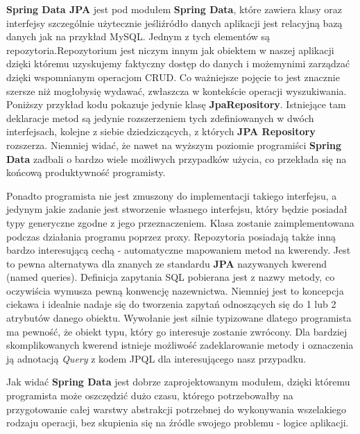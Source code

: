 	\label{tech:spring_data_jpa}
	\textbf{Spring Data JPA} jest pod modułem \textbf{Spring Data}, które zawiera klasy oraz interfejsy szczególnie użytecznie jeśliźródło danych aplikacji jest relacyjną bazą danych jak na przykład MySQL. Jednym z tych elementów są repozytoria.Repozytorium jest niczym innym jak obiektem w naszej aplikacji dzięki któremu uzyskujemy faktyczny dostęp do danych i możemynimi zarządzać dzięki wspomnianym operacjom CRUD. Co ważniejsze pojęcie to jest znacznie szersze niż mogłobysię wydawać, zwłaszcza w kontekście operacji wyszukiwania. Poniższy przykład kodu pokazuje jedynie klasę \textbf{JpaRepository}. Istniejące tam deklaracje metod są jedynie rozszerzeniem tych zdefiniowanych w dwóch interfejsach, kolejne z siebie dziedziczących, z których \textbf{JPA Repository} rozszerza. Niemniej widać, że nawet na wyższym poziomie programiści \textbf{Spring Data} zadbali o bardzo wiele możliwych przypadków użycia, co przekłada się na końcową produktywność programisty. 
	Ponadto programista nie jest zmuszony do implementacji takiego interfejsu, a jedynym jakie zadanie jest stworzenie własnego interfejsu, który będzie posiadał typy generyczne zgodne z jego przeznaczeniem. Klasa zostanie zaimplementowana podczas działania programu poprzez proxy. Repozytoria posiadają także inną bardzo interesującą cechą - automatyczne mapowaniem metod na kwerendy. Jest to pewna alternatywa dla znanych ze standardu \textbf{JPA} nazywanych kwerend (named queries). Definicja zapytania SQL pobierana jest z nazwy metody, co oczywiścia wymusza pewną konwencję nazewnictwa. Niemniej jest to koncepcja ciekawa i idealnie nadaje się do tworzenia zapytań odnoszących się do 1 lub 2 atrybutów danego obiektu. Wywołanie jest silnie typizowane dlatego programista ma pewność, że obiekt typu, który go interesuje zostanie zwrócony. Dla bardziej skomplikowanych kwerend istnieje możliwość zadeklarowanie metody i oznaczenia ją adnotacją \textit{\@{}Query} z kodem JPQL\cite{jpql} dla interesującego nasz przypadku\cite{spring_data}.
	
	Jak widać \textbf{Spring Data} jest dobrze zaprojektowanym modułem, dzięki któremu programista może oszczędzić dużo czasu, którego potrzebowałby na przygotowanie całej warstwy abstrakcji potrzebnej do wykonywania wszelakiego rodzaju operacji, bez skupienia się na źródle swojego problemu - logice aplikacji. 

